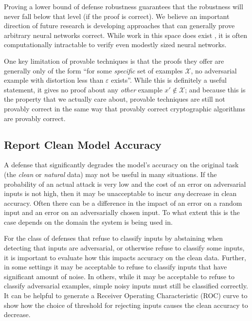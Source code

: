 \documentclass{article} %
\begin{document}
Proving a lower bound of defense
robustness guarantees that the robustness will never fall
below that level (if the proof is correct).
%
We believe an important direction of future research is developing approaches
that can generally prove arbitrary neural networks correct.
%
While work
in this space does exist \citep{katz2017reluplex,TjengXT19,XiaoTSM19,GowalDSBQUAMK18}, it is often computationally
intractable to verify even modestly sized neural networks.

One key limitation of provable techniques is that the proofs they
offer are generally only of the form ``for some \emph{specific} set of
examples $\mathcal{X}$, no adversarial example with distortion less than
$\varepsilon$ exists''.
%
While this is definitely a useful statement, it
gives no proof about any \emph{other} example $x' \not\in \mathcal{X}$;
and because this is the property that we actually care about, provable
techniques are still not provably correct in the same way that provably
correct cryptographic algorithms are provably correct.


\subsection{Report Clean Model Accuracy}
\label{sec:cleanaccuracy}

A defense that significantly degrades the model's accuracy on the original
task (the \emph{clean} or \emph{natural} data) may not be useful
in many situations.
%
If the probability of an actual attack is very low and the cost of an 
error on adversarial inputs is not
high, then it may be unacceptable to incur \emph{any} decrease in clean
accuracy.
%
Often there can be a difference in the impact of an error on a random
input and an error on an adversarially chosen input. To what extent this
is the case depends on the domain the system is being used in.

For the class of defenses that refuse to classify inputs by abstaining when
detecting that inputs are adversarial, or otherwise refuse to classify
some inputs, it is important to evaluate how this impacts accuracy on
the clean data.
%
Further, in some settings it may be acceptable to refuse to classify inputs
that have significant amount of noise. In others, while it may be acceptable
to refuse to classify adversarial examples, simple noisy inputs must still
be classified correctly.
%
It can be helpful to generate a Receiver Operating Characteristic (ROC) curve
to show how the choice of threshold for rejecting inputs causes the clean
accuracy to decrease.
\end{document}
